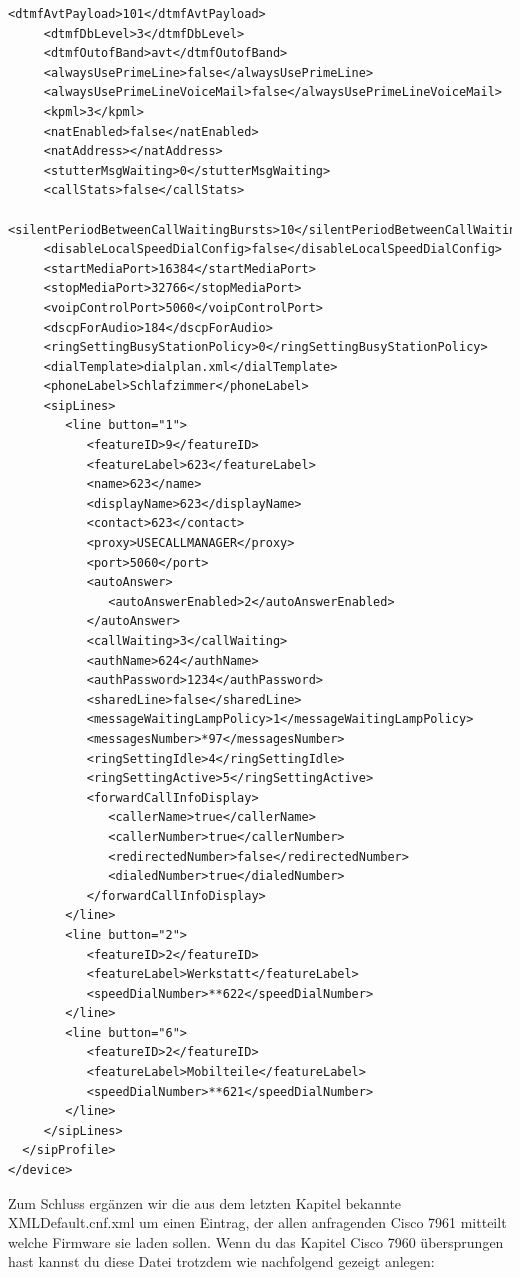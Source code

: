 \documentclass[a4paper,12pt]{scrbook}
\begin{document}
\begin{lstlisting}[caption={SEP\textbf{0012345678DE}.cnf.xml}, label=lst:cisco7961sep0012345678decnfxml]
     <dtmfAvtPayload>101</dtmfAvtPayload>
     <dtmfDbLevel>3</dtmfDbLevel>
     <dtmfOutofBand>avt</dtmfOutofBand>
     <alwaysUsePrimeLine>false</alwaysUsePrimeLine>
     <alwaysUsePrimeLineVoiceMail>false</alwaysUsePrimeLineVoiceMail>
     <kpml>3</kpml>
     <natEnabled>false</natEnabled>
     <natAddress></natAddress>
     <stutterMsgWaiting>0</stutterMsgWaiting>
     <callStats>false</callStats>
     <silentPeriodBetweenCallWaitingBursts>10</silentPeriodBetweenCallWaitingBursts>
     <disableLocalSpeedDialConfig>false</disableLocalSpeedDialConfig>
     <startMediaPort>16384</startMediaPort>
     <stopMediaPort>32766</stopMediaPort>
     <voipControlPort>5060</voipControlPort>
     <dscpForAudio>184</dscpForAudio>
     <ringSettingBusyStationPolicy>0</ringSettingBusyStationPolicy>
     <dialTemplate>dialplan.xml</dialTemplate>
     <phoneLabel>Schlafzimmer</phoneLabel>
     <sipLines>
        <line button="1">
           <featureID>9</featureID>
           <featureLabel>623</featureLabel>
           <name>623</name>
           <displayName>623</displayName>
           <contact>623</contact>
           <proxy>USECALLMANAGER</proxy>
           <port>5060</port>
           <autoAnswer>
              <autoAnswerEnabled>2</autoAnswerEnabled>
           </autoAnswer>
           <callWaiting>3</callWaiting>
           <authName>624</authName>
           <authPassword>1234</authPassword>
           <sharedLine>false</sharedLine>
           <messageWaitingLampPolicy>1</messageWaitingLampPolicy>
           <messagesNumber>*97</messagesNumber>
           <ringSettingIdle>4</ringSettingIdle>
           <ringSettingActive>5</ringSettingActive>
           <forwardCallInfoDisplay>
              <callerName>true</callerName>
              <callerNumber>true</callerNumber>
              <redirectedNumber>false</redirectedNumber>
              <dialedNumber>true</dialedNumber>
           </forwardCallInfoDisplay>
        </line>
        <line button="2">
           <featureID>2</featureID>
           <featureLabel>Werkstatt</featureLabel>
           <speedDialNumber>**622</speedDialNumber>
        </line>
        <line button="6">
           <featureID>2</featureID>
           <featureLabel>Mobilteile</featureLabel>
           <speedDialNumber>**621</speedDialNumber>
        </line>
     </sipLines>
  </sipProfile>
</device>
\end{lstlisting}

Zum Schluss ergänzen wir die aus dem letzten Kapitel bekannte XMLDefault.cnf.xml um einen Eintrag, der allen anfragenden Cisco 7961 mitteilt welche Firmware sie laden sollen.
Wenn du das Kapitel Cisco 7960 übersprungen hast kannst du diese Datei trotzdem wie nachfolgend gezeigt anlegen:
\end{document}
